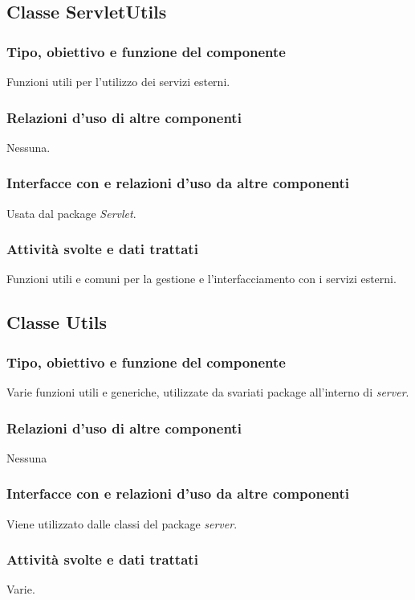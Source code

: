 \subsection{Classe ServletUtils}
\subsubsection*{Tipo, obiettivo e funzione del componente}
Funzioni utili per l'utilizzo dei servizi esterni.
\subsubsection*{Relazioni d'uso di altre componenti}
Nessuna.
\subsubsection*{Interfacce con e relazioni d'uso da altre componenti}
Usata dal package \emph{Servlet}.
\subsubsection*{Attivit\`a svolte e dati trattati}
Funzioni utili e comuni per la gestione e l'interfacciamento con i servizi
esterni.

\subsection{Classe Utils}
\subsubsection*{Tipo, obiettivo e funzione del componente}
Varie funzioni utili e generiche, utilizzate da svariati package all'interno di
\emph{server}.
\subsubsection*{Relazioni d'uso di altre componenti}
Nessuna
\subsubsection*{Interfacce con e relazioni d'uso da altre componenti}
Viene utilizzato dalle classi del package \emph{server}.
\subsubsection*{Attivit\`a svolte e dati trattati}
Varie.

\newpage

